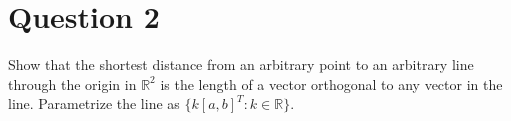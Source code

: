 \section{Question 2}

\begin{question}
    Show that the shortest distance from an arbitrary point to an arbitrary line through the origin in $\mathbb{R}^2$ is the length of a vector orthogonal to any vector in the line. Parametrize the line as $\{k[a,b]^T: k \in \mathbb{R}\}$.
\end{question}

\begin{answer}
    
\end{answer}
